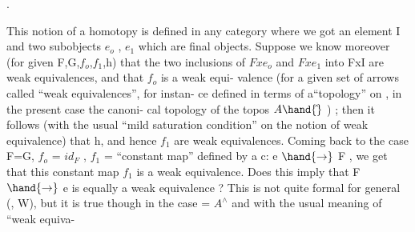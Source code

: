 .

This notion of a homotopy is defined in any category  where we got an
element I and two subobjects $e_o$ , $e_1$ which are final objects. Suppose we
 know moreover  (for given F,G,$f_o$,$f_1$,h) that the two inclusions of
$Fxe_o$ and $Fxe_1$ into FxI are weak equivalences, and that $f_o$ is a weak equi-%
valence (for a given set of arrows called ``weak equivalences'', for instan-%
ce defined in terms of a``topology'' on  , in the present case the canoni-%
cal topology of the topos $A\hand{\hat{}}$ ) ; then it follows (with the usual ``mild
saturation condition'' on the notion of weak equivalence) that h, and hence
$f_1$ are weak equivalences. Coming back to the case F=G, $f_o$ = $id_F$ , $f_1$ =
``constant map'' defined by a c: e $\hand{\to}$ F , we get that this constant map
$f_1$ is a weak equivalence. Does this imply that F $\hand{\to}$ e is equally a weak
equivalence ? This is not quite formal for general (, W), but it is 
true though in the case  = $A^\wedge$ and with the usual meaning of ``weak equiva-%
